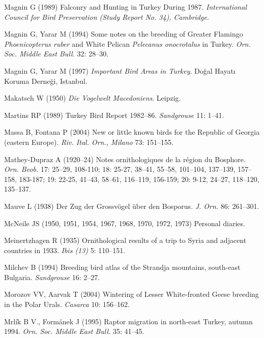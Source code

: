 \documentclass[
  letterpaper,
  DIV=11,
  numbers=noendperiod]{scrreprt}
\newlength{\cslhangindent}
\newenvironment{CSLReferences}[2] %
 {\begin{list}{}{%
  \setlength{\itemindent}{0pt}
  \setlength{\leftmargin}{0pt}
  \setlength{\parsep}{0pt}
  \ifodd #1
   \setlength{\leftmargin}{\cslhangindent}
   \setlength{\itemindent}{-1\cslhangindent}
  \fi
  \setlength{\itemsep}{#2\baselineskip}}}
 {\end{list}}
\begin{document}
\begin{CSLReferences}{0}{1}
Magnin G (1989) {Falconry and Hunting in Turkey During 1987}.
\emph{International Council for Bird Preservation (Study Report No. 34),
Cambridge}.

Magnin G, Yarar M (1994) {Some notes on the breeding of Greater Flamingo
\emph{Phoenicopterus ruber} and White Pelican \emph{Pelecanus
onocrotalus} in Turkey}. \emph{Orn. Soc. Middle East Bull.} 32: 28--30.

Magnin G, Yarar M (1997) \emph{{Important Bird Areas in Turkey}}. Doğal
Hayatı Koruma Derneği, Istanbul.

Makatsch W (1950) \emph{{Die Vogelwelt Macedoniens}}. Leipzig.

Martins RP (1989) {Turkey Bird Report 1982--86}. \emph{Sandgrouse} 11:
1--41.

Massa B, Fontana P (2004) {New or little known birds for the Republic of
Georgia (eastern Europe)}. \emph{Riv. Ital. Orn., Milano} 73: 151--155.

Mathey-Dupraz A (1920--24) {Notes ornithologiques de la région du
Bosphore}. \emph{Orn. Beob.} 17: 25--29, 108-110; 18: 25-27, 38--41,
55--58, 101--104, 137--139, 157--158, 183-187; 19: 22-25, 41--43,
58--61, 116--119, 156-159; 20: 9-12, 24--27, 118--120, 135--137.

Mauve L (1938) {Der Zug der Grossvögel über den Bosporus}. \emph{J.
Orn.} 86: 261--301.

McNeile JS (1950, 1951, 1954, 1967, 1968, 1970, 1972, 1973) {Personal
diaries}.

Meinertzhagen R (1935) {Ornithological results of a trip to Syria and
adjacent countries in 1933}. \emph{Ibis (13)} 5: 110--151.

Milchev B (1994) {Breeding bird atlas of the Strandja mountains,
south-east Bulgaria}. \emph{Sandgrouse} 16: 2--27.

Morozov VV, Aarvak T (2004) {Wintering of Lesser White-fronted Geese
breeding in the Polar Urals}. \emph{Casarca} 10: 156--162.

Mrlík B V., Formánek J (1995) {Raptor migration in north-east Turkey,
autumn 1994}. \emph{Orn. Soc. Middle East Bull.} 35: 41--45.


\end{CSLReferences}
\end{document}
